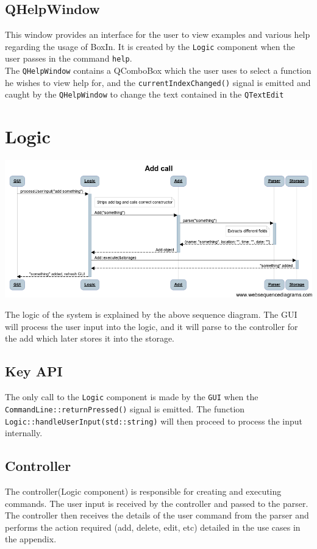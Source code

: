 \documentclass[12pt]{extarticle}
\begin{document}
\subsection{QHelpWindow}
This window provides an interface for the user to view examples and various help regarding the usage of BoxIn. It is created by the \texttt{Logic} component when the user passes in the command \texttt{help}.\\
The \texttt{QHelpWindow} contains a QComboBox which the user uses to select a function he wishes to view help for, and the \texttt{currentIndexChanged()} signal is emitted and caught by the \texttt{QHelpWindow} to change the text contained in the \texttt{QTextEdit}
\newpage

\section{Logic}

\includegraphics[width=\textwidth]{add_call_diagram}

The logic of the system is explained by the above sequence diagram. The GUI will process the user input into the logic, and it will parse to the controller for the add which later stores it into the storage.

\subsection{Key API}
The only call to the \texttt{Logic} component is made by the \texttt{GUI} when the \texttt{CommandLine::returnPressed()} signal is emitted. The function \texttt{Logic::handleUserInput(std::string)} will then proceed to process the input internally.

\subsection{Controller}

The controller(Logic component) is responsible for creating and executing commands. The user input is received by the controller and passed to the parser. The controller then receives the details of the user command from the parser and performs the action required (add, delete, edit, etc) detailed in the use cases in the appendix.
\end{document}
